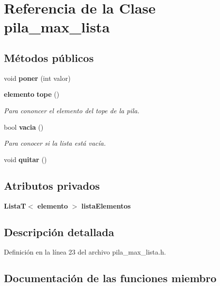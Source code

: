 \section{Referencia de la Clase pila\-\_\-max\-\_\-lista}
\label{classpila__max__lista}
\subsection*{Métodos públicos}
\begin{DoxyCompactItemize}
\item 
void {\bfseries poner} (int valor)\label{classpila__max__lista_ab2ea0f0d1dbe9d54cb66128a479d34d8}

\item 
{\bf elemento} {\bf tope} ()
\begin{DoxyCompactList}\small\item\em Para cononcer el elemento del tope de la pila. \end{DoxyCompactList}\item 
bool {\bf vacia} ()
\begin{DoxyCompactList}\small\item\em Para conocer si la lista está vacía. \end{DoxyCompactList}\item 
void {\bfseries quitar} ()\label{classpila__max__lista_a5409e2c589fe4c11eb1464c469a43b35}

\end{DoxyCompactItemize}
\subsection*{Atributos privados}
\begin{DoxyCompactItemize}
\item 
{\bf Lista\-T}$<$ {\bf elemento} $>$ {\bfseries lista\-Elementos}\label{classpila__max__lista_a5bcf6cdb3d27b7028380e20f75588aaa}

\end{DoxyCompactItemize}


\subsection{Descripción detallada}


Definición en la línea 23 del archivo pila\-\_\-max\-\_\-lista.\-h.



\subsection{Documentación de las funciones miembro}
